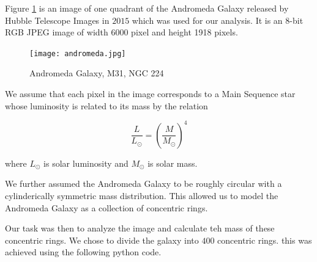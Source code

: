  Figure \ref{andromeda_image} is an image of one quadrant of the Andromeda Galaxy released by Hubble Telescope Images in $2015$ which was used for our analysis. It is an 8-bit RGB JPEG image of width 6000 pixel and height 1918 pixels.
    
\begin{figure}[h!]
\label{andromeda_image}
\centering
\texttt{[image: andromeda.jpg]}
\caption{Andromeda Galaxy, M31, NGC 224}
\end{figure}

We assume that each pixel in the image corresponds to a Main Sequence star whose luminosity is related to its mass by the relation 

\begin{equation}
\frac{L}{L_{\odot}} = (\frac{M}{M_{\odot}})^4 
\end{equation}

where $L_{\odot}$ is solar luminosity and $M_{\odot}$ is solar mass.

We further assumed the Andromeda Galaxy to be roughly circular with a cylinderically symmetric mass distribution. This allowed us to model the Andromeda Galaxy as a collection of concentric rings. 

Our task was then to analyze the image and calculate teh mass of these concentric rings. We chose to divide the galaxy into $400$ concentric rings. this was achieved using the following python code.

